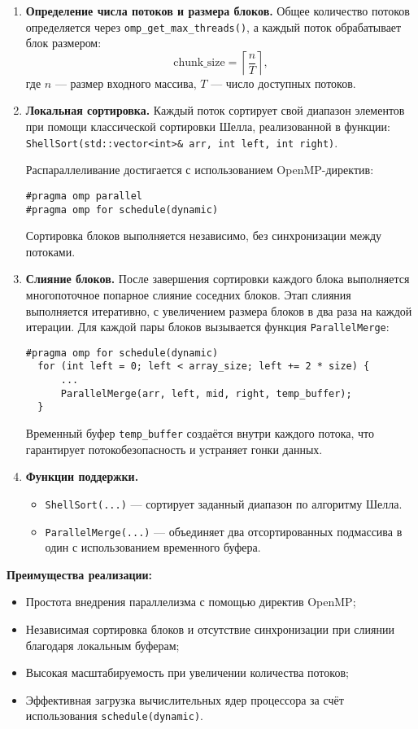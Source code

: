 \documentclass[12pt]{article}
\begin{document}
\begin{enumerate}
  \item \textbf{Определение числа потоков и размера блоков.} 
  Общее количество потоков определяется через \texttt{omp\_get\_max\_threads()}, а каждый поток обрабатывает блок размером:
  \[
  \text{chunk\_size} = \left\lceil \frac{n}{T} \right\rceil,
  \]
  где $n$ — размер входного массива, $T$ — число доступных потоков.

  \item \textbf{Локальная сортировка.}
  Каждый поток сортирует свой диапазон элементов при помощи классической сортировки Шелла, реализованной в функции:
  \texttt{ShellSort(std::vector<int>\& arr, int left, int right)}.

  Распараллеливание достигается с использованием OpenMP-директив:
  \begin{lstlisting}
#pragma omp parallel
#pragma omp for schedule(dynamic)
  \end{lstlisting}
  Сортировка блоков выполняется независимо, без синхронизации между потоками.

  \item \textbf{Слияние блоков.}
  После завершения сортировки каждого блока выполняется многопоточное попарное слияние соседних блоков. Этап слияния выполняется итеративно, с увеличением размера блоков в два раза на каждой итерации. Для каждой пары блоков вызывается функция \texttt{ParallelMerge}:
  \begin{lstlisting}
#pragma omp for schedule(dynamic)
  for (int left = 0; left < array_size; left += 2 * size) {
      ...
      ParallelMerge(arr, left, mid, right, temp_buffer);
  }
  \end{lstlisting}
  Временный буфер \texttt{temp\_buffer} создаётся внутри каждого потока, что гарантирует потокобезопасность и устраняет гонки данных.

  \item \textbf{Функции поддержки.}
  \begin{itemize}
    \item \texttt{ShellSort(...)} — сортирует заданный диапазон по алгоритму Шелла.
    \item \texttt{ParallelMerge(...)} — объединяет два отсортированных подмассива в один с использованием временного буфера.
  \end{itemize}
\end{enumerate}

\textbf{Преимущества реализации:}
\begin{itemize}
  \item Простота внедрения параллелизма с помощью директив OpenMP;
  \item Независимая сортировка блоков и отсутствие синхронизации при слиянии благодаря локальным буферам;
  \item Высокая масштабируемость при увеличении количества потоков;
  \item Эффективная загрузка вычислительных ядер процессора за счёт использования \texttt{schedule(dynamic)}.
\end{itemize}
\end{document}
